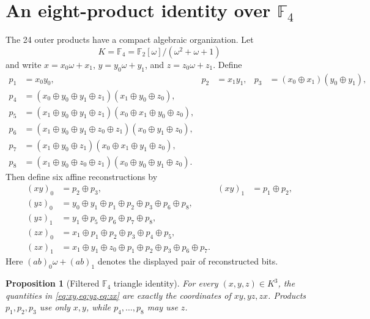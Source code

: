 \documentclass[11pt]{article}
\newtheorem{proposition}[proposition]{Proposition}
\theoremstyle{definition}
\newcommand{\F}{\mathbb F}
\begin{document}
\section{An eight-product identity over \texorpdfstring{\(\F_4\)}{F4}}
\label{sec:gf4}

The 24 outer products have a compact algebraic organization.  Let
\[
 K=\F_4=\F_2[\omega]/(\omega^2+\omega+1)
\]
and write \(x=x_0\omega+x_1\), \(y=y_0\omega+y_1\), and
\(z=z_0\omega+z_1\).  Define
\begin{align}
 p_1&=x_0y_0, &
 p_2&=x_1y_1, &
 p_3&=(x_0\oplus x_1)(y_0\oplus y_1),
 \label{eq:p123}\\
 p_4&=(x_0\oplus y_0\oplus y_1\oplus z_1)(x_1\oplus y_0\oplus z_0),\nonumber\\
 p_5&=(x_1\oplus y_0\oplus y_1\oplus z_1)(x_0\oplus x_1\oplus y_0\oplus z_0),\nonumber\\
 p_6&=(x_1\oplus y_0\oplus y_1\oplus z_0\oplus z_1)(x_0\oplus y_1\oplus z_0),\nonumber\\
 p_7&=(x_1\oplus y_0\oplus z_1)(x_0\oplus x_1\oplus y_1\oplus z_0),\nonumber\\
 p_8&=(x_1\oplus y_0\oplus z_0\oplus z_1)(x_0\oplus y_0\oplus y_1\oplus z_0).
 \label{eq:p45678}
\end{align}
Then define six affine reconstructions by
\begin{align}
 (xy)_0&=p_2\oplus p_3, &
 (xy)_1&=p_1\oplus p_2,
 \label{eq:xy}\\
 (yz)_0&=y_0\oplus y_1\oplus p_1\oplus p_2\oplus p_3\oplus p_6\oplus p_8,\nonumber\\
 (yz)_1&=y_1\oplus p_5\oplus p_6\oplus p_7\oplus p_8,
 \label{eq:yz}\\
 (zx)_0&=x_1\oplus p_1\oplus p_2\oplus p_3\oplus p_4\oplus p_5,\nonumber\\
 (zx)_1&=x_1\oplus y_1\oplus z_0\oplus p_1\oplus p_2\oplus p_3\oplus p_6\oplus p_7.
 \label{eq:zx}
\end{align}
Here \((ab)_0\omega+(ab)_1\) denotes the displayed pair of reconstructed bits.

\begin{proposition}[Filtered \(\F_4\) triangle identity]
\label{prop:gf4}
For every \((x,y,z)\in K^3\), the quantities in
\cref{eq:xy,eq:yz,eq:zx} are exactly the coordinates of \(xy,yz,zx\).  Products
\(p_1,p_2,p_3\) use only \(x,y\), while \(p_4,\ldots,p_8\) may use \(z\).
\end{proposition}
\end{document}
